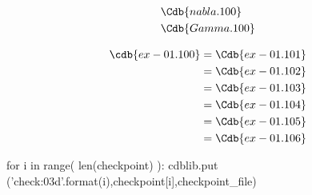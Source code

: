 \documentclass[12pt]{cdblatex}
\begin{document}
\clearpage

\begin{align*}
   &\Cdb{nabla.100}\\
   &\Cdb{Gamma.100}
\end{align*}

\begin{align*}
   \cdb{ex-01.100} &= \Cdb{ex-01.101}\\
                   &= \Cdb{ex-01.102}\\
                   &= \Cdb{ex-01.103}\\
                   &= \Cdb{ex-01.104}\\
                   &= \Cdb{ex-01.105}\\
                   &= \Cdb{ex-01.106}
\end{align*}

\clearpage


\bgroup
{}
\begin{cadabra}
   for i in range( len(checkpoint) ):
      cdblib.put ('check{:03d}'.format(i),checkpoint[i],checkpoint_file)
\end{cadabra}
\egroup
\end{document}
